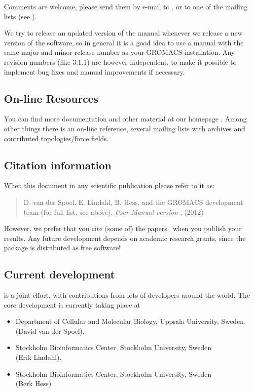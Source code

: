 \documentclass[11pt,a4paper,twoside]{gmxmanual}
\begin{document}
{Comments are welcome, please send them by e-mail to {\email}, or to
one of the mailing lists (see \wwwpage).

We try to release an updated version of the manual whenever
we release a new version of the software, so in general 
it is a good idea to use a manual with the same major and
minor release number as your GROMACS installation. 
Any revision numbers (like 3.1.1) are however independent, 
to make it possible to implement bug fixes and manual
improvements if necessary. 

\subsection*{On-line Resources}
You can find more documentation and other material at our homepage
\wwwpage. Among other things there is an on-line reference, several
{\gromacs} mailing lists with archives and contributed
topologies/force fields.

\subsection*{Citation information}
When  this document in any scientific publication
please refer to it as:
\begin{quote}
\raggedright
D. van der Spoel, E. Lindahl, B. Hess, and the GROMACS development team (for full list, see above),
\hspace{0.3em} {\em {\gromacs} {U}ser {M}anual version \gmxver},
\hspace{0.3em} {\wwwpage} (2012)
\end{quote}
However, we prefer that you cite (some of) the {\gromacs}
papers~\cite{Bekker93a,Berendsen95a,Lindahl2001a,Spoel2005a,Hess2008b} when you publish
your results. Any future development depends on academic research
grants, since the package is distributed as free software!

\subsection*{Current development}
{\gromacs} is a joint effort, with contributions from lots of developers around
the world. The core development is currently taking place at
\begin{itemize}
\item Department of Cellular and Molecular Biology, Uppsala University, Sweden.\\ 
(David van der Spoel).
\item Stockholm Bioinformatics Center, Stockholm University, Sweden \\
(Erik Lindahl).
\item Stockholm Bioinformatics Center, Stockholm University, Sweden \\
(Berk Hess)
\end{itemize}

}
\end{document}
